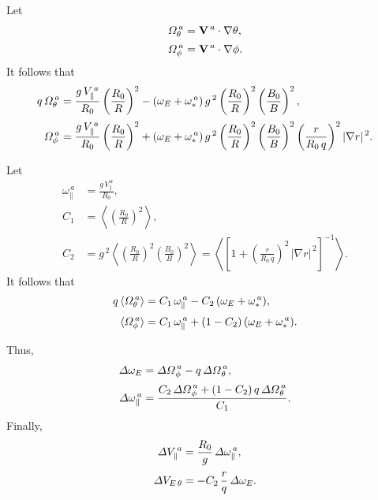 \documentclass[12pt]{article}
\begin{document}
Let
\begin{align}
{\mit\Omega}_\theta^{\,a} &= {\bf V}^{\,a}\cdot\nabla\theta,\\[0.5ex]
{\mit\Omega}_\phi^{\,a} &= {\bf V}^{\,a}\cdot\nabla\phi.
\end{align}
It follows that
\begin{align}
q\,{\mit\Omega}_\theta^{\,a}& = \frac{g\,V_\parallel^{\,a}}{R_0}\left(\frac{R_0}{R}\right)^2- (\omega_E+\omega_{\ast}^{\,a})\,g^{\,2}
\left(\frac{R_0}{R}\right)^2\left(\frac{B_0}{B}\right)^2,\\[0.5ex]
{\mit\Omega}_\phi^{\,a}& = \frac{g\,V_\parallel^{\,a}}{R_0}\left(\frac{R_0}{R}\right)^2+ (\omega_E+\omega_{\ast}^{\,a})\,g^{\,2}
\left(\frac{R_0}{R}\right)^2\left(\frac{B_0}{B}\right)^2\left(\frac{r}{R_0\,q}\right)^2|\nabla r|^{\,2}.
\end{align}

Let 
\begin{align}
\omega_{\parallel}^{\,a} &= \frac{g\,V_\parallel^{\,a}}{R_0},\\[0.5ex]
C_1 &= \left\langle \left(\frac{R_0}{R}\right)^2\right\rangle,\\[0.5ex]
C_2 &= g^{\,2} \left\langle \left(\frac{R_0}{R}\right)^2\left(\frac{B_0}{B}\right)^2\right\rangle=\left\langle
\left[1+\left(\frac{r}{R_0\,q}\right)^2\,|\nabla r|^{\,2}\right]^{-1}\right\rangle.
\end{align}
It follows that
\begin{align}
q\,\langle{\mit\Omega}_\theta^{\,a}\rangle &= C_1\,\omega_\parallel^{\,a}- C_2\,(\omega_E+\omega_\ast^{\,a}),\\[0.5ex]
\langle{\mit\Omega}_\phi^{\,a}\rangle &= C_1\,\omega_\parallel^{\,a} +(1- C_2)\,(\omega_E+\omega_\ast^{\,a}).
\end{align}

Thus,
\begin{align}
{\mit\Delta}\omega_E &= {\mit\Delta\Omega}_\phi^{\,a}-q\,{\mit\Delta\Omega}_\theta^{\,a},\\[0.5ex]
{\mit\Delta}\omega_\parallel^{\,a} &= \frac{C_2\,{\mit\Delta\Omega}_\phi^{\,a} + (1-C_2)\,q\,{\mit\Delta\Omega}_\theta^{\,a}}{C_1}.
\end{align}
Finally,
\begin{align}
{\mit\Delta}V_{\parallel}^{\,a} &=\frac{R_0}{g}\,{\mit\Delta}\omega_\parallel^{\,a},\\[0.5ex]
{\mit\Delta}V_{E\,\theta} &= - C_2\,\frac{r}{q}\,{\mit\Delta}\omega_E.
\end{align}
\end{document}
